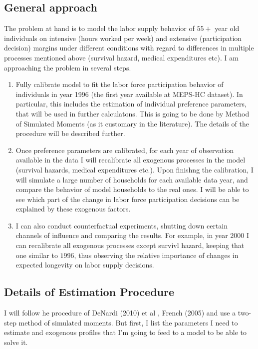 \documentclass[
10pt, %
a4paper, %
oneside, %
headinclude,footinclude, %
BCOR5mm, %
]{scrartcl}
\begin{document}
\subsection{General approach}
The problem at hand is to model the labor supply behavior of $55+$ year old individuals on intensive (hours worked per week) and extensive (participation decision) margins under different conditions with regard to differences in multiple processes mentioned above (survival hazard, medical expenditures etc). I am approaching the problem in several steps.
\begin{enumerate}
\item Fully calibrate model to fit the labor force participation behavior of individuals in year 1996 (the first year available at MEPS-HC dataset). In particular, this includes the estimation of individual preference parameters, that will be used in further calculatons. This is going to be done by Method of Simulated Moments (as it customary in the literature). The details of the procedure will be described further.
\item Once preference parameters are calibrated, for each year of observation available in the data I will recalibrate all exogenous processes in the model (survival hazards, medical expenditures etc.). Upon finishng the calibration, I will simulate a large number of households for each available data year, and compare the behavior of model households to the real ones. I will be able to see which part of the change in labor force participation decisions can be explained by these exogenous factors.
\item I can also conduct counterfactual experiments, shutting down certain channels of influence and comparing the results. For example, in year $2000$ I can recalibrate all exogenous processes except survivl hazard, keeping that one similar to $1996$, thus observing the relative importance of changes in expected longevity on labor supply decisions. 
\end{enumerate}

\subsection{Details of Estimation Procedure}
I will follow he procedure of DeNardi (2010) et al \cite{DeNardi2010}, French (2005) \cite{French2005} and use a two-step method of simulated moments. But first, I list the parameters I need to estimate and exogenous profiles that I'm going to feed to a model to be able to solve it.
\end{document}
